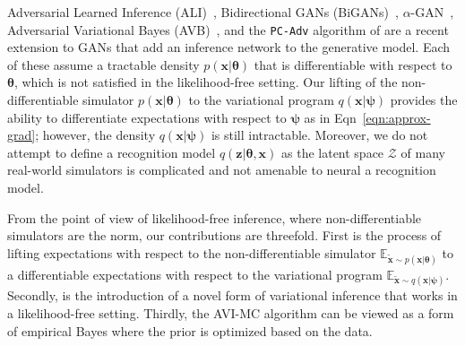 \documentclass[twocolumn,superscriptaddress,aps]{revtex4-1}
\newcommand{\kcnote}[1]{\textcolor{red}{[KC: #1]}}
\newcommand{\bftheta}{{\bm \theta}}
\newcommand{\bfpsi}{{\bm \psi}}
\newcommand{\bfphi}{{\bm \phi}}
\newcommand{\bfx}{\mathbf{x}}
\newcommand{\bfz}{\mathbf{z}}
\theoremstyle{plain}
\begin{document}
Adversarial Learned Inference (ALI)~\citep{dumoulin2016adversarially},
Bidirectional GANs (BiGANs)~\citep{donahue2016adversarial},
$\alpha$-GAN~\citep{rosca2017variational}, Adversarial Variational Bayes
(AVB)~\citep{DBLP:journals/corr/MeschederNG17}, and the \texttt{PC-Adv}
algorithm of  \citep{2017arXiv170208235H}  are a recent extension to GANs that
add an inference network to the generative model.  Each of these assume a
tractable density $p(\bfx|\bftheta)$ that is differentiable with respect to
$\bftheta$, which is  not satisfied in the likelihood-free setting. Our lifting
of the non-differentiable simulator $p(\bfx|\bftheta)$ to the variational
program $q(\bfx | \bfpsi)$ provides the ability to differentiate expectations
with respect to $\bfpsi$ as in Eqn~\ref{eqn:approx-grad}; however, the density
$q(\bfx | \bfpsi)$ is still intractable. Moreover, we do not attempt to define a
recognition model $q(\bfz | \bftheta, \bfx)$ as the latent space $\mathcal{Z}$
of many real-world simulators is complicated and not amenable to neural a
recognition model.


From the point of view of likelihood-free inference, where  non-differentiable
simulators are the norm, our contributions are threefold. First is the process
of lifting expectations with respect to the non-differentiable simulator
$\mathbb{E}_{\tilde{\bfx} \sim p(\bfx | \bftheta)}$ to a differentiable
expectations with respect to the variational program $\mathbb{E}_{\tilde{\bfx}
\sim q(\bfx | \bfpsi)}$. Secondly, is the introduction of a novel form of
variational inference that works in a likelihood-free setting. Thirdly, the
AVI-MC algorithm can be viewed as a form of empirical Bayes where the prior is
optimized based on the data.

\end{document}
